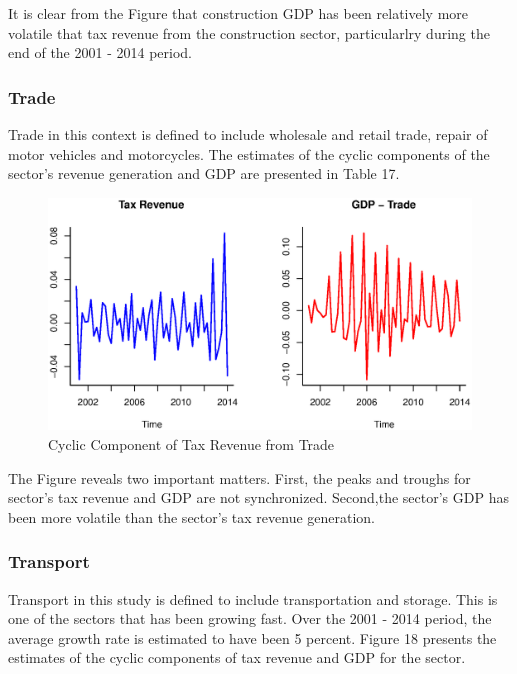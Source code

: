 \documentclass[12pt,a4paper,final]{article}
\begin{document}
It is clear from the Figure that construction GDP has been relatively more volatile that tax revenue from the construction sector, particularlry during the end of the 2001 - 2014 period.

\subsubsection{Trade}

Trade in this context is defined to include wholesale and retail trade, repair of motor vehicles and motorcycles. The estimates of the cyclic components of the sector's revenue generation and GDP are presented in Table 17. 

\begin{figure}[h]
\centering
\begin{small}
\caption{Cyclic Component of Tax Revenue from Trade}
\end{small}
\includegraphics[scale=0.501]{trade.eps} 
\end{figure}

The Figure reveals two important matters. First, the peaks and troughs for sector's tax revenue and GDP are not synchronized. Second,the sector's GDP has been more volatile than the sector's tax revenue generation.

\subsubsection{Transport}

Transport in this study is defined to include transportation and storage. This is one of the sectors that has been growing fast. Over the 2001 - 2014 period, the average growth rate is estimated to have been 5 percent.  Figure 18 presents the estimates of the cyclic components of tax revenue and GDP for the sector.
\end{document}
